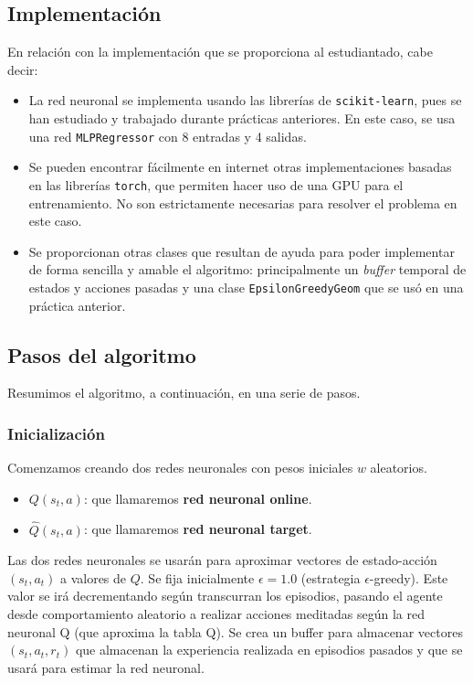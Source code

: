 \documentclass{article}
\begin{document}
\subsection{Implementación}
En relación con la implementación que se proporciona al estudiantado, cabe decir:
\begin{itemize}
    \item La red neuronal se implementa usando las librerías de \texttt{scikit-learn}, pues se han estudiado y trabajado durante prácticas anteriores. En este caso, se usa una red \texttt{MLPRegressor} con 8 entradas y 4 salidas.
    \item Se pueden encontrar fácilmente en internet otras implementaciones basadas en las librerías \texttt{torch}, que permiten hacer uso de una GPU para el entrenamiento. No son estrictamente necesarias para resolver el problema en este caso.
    \item Se proporcionan otras clases que resultan de ayuda para poder implementar de forma sencilla y amable el algoritmo: principalmente un \textit{buffer} temporal de estados y acciones pasadas y una clase \texttt{EpsilonGreedyGeom} que se usó en una práctica anterior.
\end{itemize}


\subsection{Pasos del algoritmo}
Resumimos el algoritmo, a continuación, en una serie de pasos. 
\subsubsection{Inicialización}
Comenzamos creando dos redes neuronales con pesos iniciales $w$ aleatorios.
    \begin{itemize}
        \item $Q(s_t, a)$: que llamaremos \textbf{red neuronal online}.
        \item $\hat{Q}(s_t, a)$: que llamaremos \textbf{red neuronal target}.  
    \end{itemize}  
Las dos redes neuronales se usarán para aproximar vectores de estado-acción $(s_t, a_t)$ a valores de $Q$. Se fija inicialmente $\epsilon=1.0$ (estrategia $\epsilon$-greedy). Este valor se irá decrementando según transcurran los episodios, pasando el agente desde comportamiento aleatorio a realizar acciones meditadas según la red neuronal Q (que aproxima la tabla Q). Se crea un buffer para almacenar vectores $(s_t, a_t, r_t)$ que almacenan la experiencia realizada en episodios pasados y que se usará para estimar la red neuronal.
\end{document}
